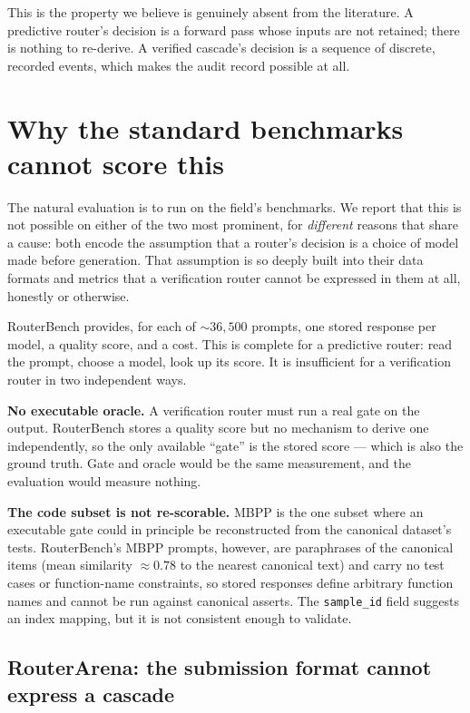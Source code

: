 \documentclass[11pt]{article}
\begin{document}
This is the property we believe is genuinely absent from the literature. A predictive router's
decision is a forward pass whose inputs are not retained; there is nothing to re-derive. A verified
cascade's decision is a sequence of discrete, recorded events, which makes the audit record
possible at all.

\section{Why the standard benchmarks cannot score this}
\label{sec:why-not-routerbench}

The natural evaluation is to run on the field's benchmarks. We report that this is not possible on
either of the two most prominent, for \emph{different} reasons that share a cause: both encode the
assumption that a router's decision is a choice of model made before generation. That assumption is
so deeply built into their data formats and metrics that a verification router cannot be expressed
in them at all, honestly or otherwise.

RouterBench provides, for each of ${\sim}36{,}500$ prompts, one stored response per model, a
quality score, and a cost. This is complete for a predictive router: read the prompt, choose a
model, look up its score. It is insufficient for a verification router in two independent ways.

\textbf{No executable oracle.} A verification router must run a real gate on the output. RouterBench
stores a quality score but no mechanism to derive one independently, so the only available ``gate''
is the stored score --- which is also the ground truth. Gate and oracle would be the same
measurement, and the evaluation would measure nothing.

\textbf{The code subset is not re-scorable.} MBPP is the one subset where an executable gate could
in principle be reconstructed from the canonical dataset's tests. RouterBench's MBPP prompts,
however, are paraphrases of the canonical items (mean similarity $\approx 0.78$ to the nearest
canonical text) and carry no test cases or function-name constraints, so stored responses define
arbitrary function names and cannot be run against canonical asserts. The \texttt{sample\_id} field
suggests an index mapping, but it is not consistent enough to validate.

\subsection{RouterArena: the submission format cannot express a cascade}
\end{document}
